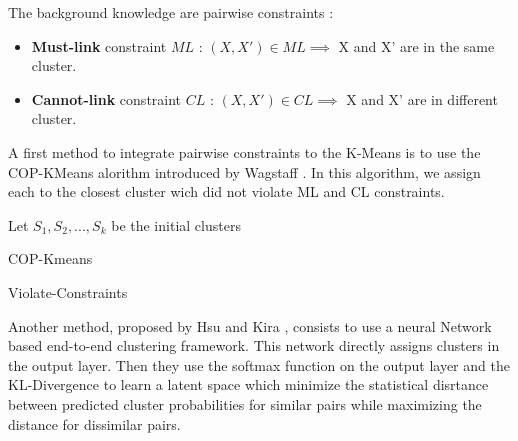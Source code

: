 The background knowledge are pairwise constraints :
\begin{itemize}
\item \textbf{Must-link} constraint $ML$ : $(X, X') \in ML \implies $ X and X' are in the
  same cluster.
\item \textbf{Cannot-link} constraint $CL$ : $(X, X') \in CL \implies $ X and X' are in
  different cluster.
\end{itemize}
A first method to integrate pairwise constraints to the K-Means is to use the
COP-KMeans alorithm introduced by Wagstaff
\cite{Wagstaff:2001:CKC:645530.655669}. In this algorithm, we assign each to the
closest cluster wich did not violate ML and CL constraints.\\
\begin{algorithm}[!h]
  Let $S_1, S_2 , ..., S_k$ be the initial clusters\\
  \caption{COP-Kmeans}
\end{algorithm}

\begin{algorithm}[!h]
  \caption{Violate-Constraints}
\end{algorithm}
Another method, proposed by Hsu and Kira \cite{2015arXiv151106321H}, consists to
use a neural Network based end-to-end clustering framework. This network
directly assigns clusters in the output layer. Then they use the softmax function
on the output layer and the KL-Divergence to learn a latent space which minimize
the statistical disrtance between predicted cluster probabilities for similar
pairs while maximizing the distance for dissimilar pairs.

